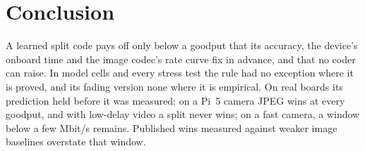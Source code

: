 \documentclass[conference,10pt]{IEEEtran}
\begin{document}
\section{Conclusion}
A learned split code pays off only below a goodput that its accuracy, the device's onboard time and the image codec's
rate curve fix in advance, and that no coder can raise. In \BeCells{} model cells and every stress test the rule had
no exception where it is proved, and its fading version none where it is empirical. On real boards its prediction held
before it was measured: on a Pi~5 camera JPEG wins at every goodput, and with low-delay video a split never wins; on a
fast camera, a window below a few Mbit/s remains. Published wins measured against weaker image baselines overstate
that window.



\end{document}
